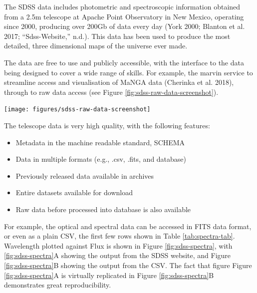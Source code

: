 \documentclass[
]{article}
\providecommand{\tightlist}{%
  \setlength{\itemsep}{0pt}\setlength{\parskip}{0pt}}
\let\origfigure\figure
\let\endorigfigure\endfigure
\renewenvironment{figure}[1][2] {
    \expandafter\origfigure\expandafter[H]
} {
    \endorigfigure
}
\begin{document}
The SDSS data includes photometric and spectroscopic information obtained from a 2.5m telescope at Apache Point Observatory in New Mexico, operating since 2000, producing over 200Gb of data every day (York 2000; Blanton et al. 2017; ``Sdss-Website,'' n.d.). This data has been used to produce the most detailed, three dimensional maps of the universe ever made.

The data are free to use and publicly accessible, with the interface to the data being designed to cover a wide range of skills. For example, the marvin service to streamline access and visualisation of MaNGA data (Cherinka et al. 2018), through to raw data access (see Figure \ref{fig:sdss-raw-data-screenshot}).

\begin{figure}

{\centering \texttt{[image: figures/sdss-raw-data-screenshot]} 

}

\caption{Screenshot of Raw data avaialbe through DR15 FITS.}\label{fig:sdss-raw-data-screenshot}
\end{figure}

The telescope data is very high quality, with the following features:

\begin{itemize}
\tightlist
\item
  Metadata in the machine readable standard, SCHEMA
\item
  Data in multiple formats (e.g., .csv, .fits, and database)
\item
  Previously released data available in archives
\item
  Entire datasets available for download
\item
  Raw data before processed into database is also available
\end{itemize}

For example, the optical and spectral data can be accessed in FITS data format, or even as a plain CSV, the first few rows shown in Table \ref{tab:spectra-tab}. Wavelength plotted against Flux is shown in Figure \ref{fig:sdss-spectra}, with \ref{fig:sdss-spectra}A showing the output from the SDSS website, and Figure \ref{fig:sdss-spectra}B showing the output from the CSV. The fact that figure Figure \ref{fig:sdss-spectra}A is virtually replicated in Figure \ref{fig:sdss-spectra}B demonstrates great reproducibility.
\end{document}

